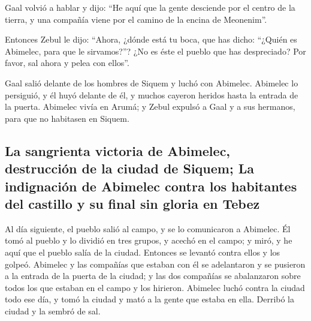  Gaal volvió a hablar y dijo: ``He aquí que la gente
desciende por el centro de la tierra, y una compañía viene por el camino
de la encina de Meonenim''.

 Entonces Zebul le dijo: ``Ahora, ¿dónde está tu boca,
que has dicho: ``¿Quién es Abimelec, para que le sirvamos?''? ¿No es
éste el pueblo que has despreciado? Por favor, sal ahora y pelea con
ellos''.

 Gaal salió delante de los hombres de Siquem y luchó con
Abimelec.  Abimelec lo persiguió, y él huyó delante de
él, y muchos cayeron heridos hasta la entrada de la puerta.
 Abimelec vivía en Arumá; y Zebul expulsó a Gaal y a sus
hermanos, para que no habitasen en Siquem.

\hypertarget{la-sangrienta-victoria-de-abimelec-destrucciuxf3n-de-la-ciudad-de-siquem-la-indignaciuxf3n-de-abimelec-contra-los-habitantes-del-castillo-y-su-final-sin-gloria-en-tebez}{%
\subsection{La sangrienta victoria de Abimelec, destrucción de la ciudad
de Siquem; La indignación de Abimelec contra los habitantes del castillo
y su final sin gloria en
Tebez}\label{la-sangrienta-victoria-de-abimelec-destrucciuxf3n-de-la-ciudad-de-siquem-la-indignaciuxf3n-de-abimelec-contra-los-habitantes-del-castillo-y-su-final-sin-gloria-en-tebez}}

 Al día siguiente, el pueblo salió al campo, y se lo
comunicaron a Abimelec.  Él tomó al pueblo y lo dividió
en tres grupos, y acechó en el campo; y miró, y he aquí que el pueblo
salía de la ciudad. Entonces se levantó contra ellos y los golpeó.
 Abimelec y las compañías que estaban con él se
adelantaron y se pusieron a la entrada de la puerta de la ciudad; y las
dos compañías se abalanzaron sobre todos los que estaban en el campo y
los hirieron.  Abimelec luchó contra la ciudad todo ese
día, y tomó la ciudad y mató a la gente que estaba en ella. Derribó la
ciudad y la sembró de sal.

